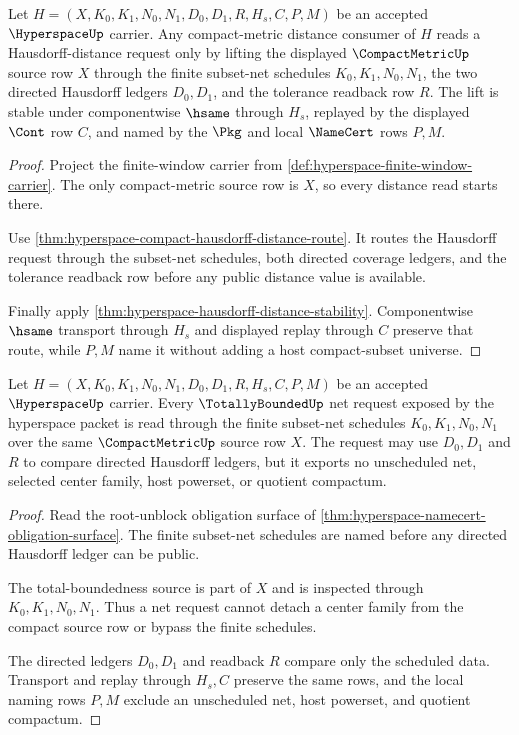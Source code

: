 \begin{theorem}
\label{thm:hyperspace-compactmetric-distance-lift}
Let $H=(X,K_0,K_1,N_0,N_1,D_0,D_1,R,H_s,C,P,M)$ be an accepted $\HyperspaceUp$ carrier. Any compact-metric distance consumer of $H$ reads a Hausdorff-distance request only by lifting the displayed $\CompactMetricUp$ source row $X$ through the finite subset-net schedules $K_0,K_1,N_0,N_1$, the two directed Hausdorff ledgers $D_0,D_1$, and the tolerance readback row $R$. The lift is stable under componentwise $\hsame$ through $H_s$, replayed by the displayed $\Cont$ row $C$, and named by the $\Pkg$ and local $\NameCert$ rows $P,M$.
\end{theorem}
\begin{proof}
Project the finite-window carrier from \autoref{def:hyperspace-finite-window-carrier}. The only compact-metric source row is $X$, so every distance read starts there.

Use \autoref{thm:hyperspace-compact-hausdorff-distance-route}. It routes the Hausdorff request through the subset-net schedules, both directed coverage ledgers, and the tolerance readback row before any public distance value is available.

Finally apply \autoref{thm:hyperspace-hausdorff-distance-stability}. Componentwise $\hsame$ transport through $H_s$ and displayed replay through $C$ preserve that route, while $P,M$ name it without adding a host compact-subset universe.
\end{proof}

\begin{theorem}
\label{thm:hyperspace-totallybounded-net-lift}
Let $H=(X,K_0,K_1,N_0,N_1,D_0,D_1,R,H_s,C,P,M)$ be an accepted $\HyperspaceUp$ carrier. Every $\TotallyBoundedUp$ net request exposed by the hyperspace packet is read through the finite subset-net schedules $K_0,K_1,N_0,N_1$ over the same $\CompactMetricUp$ source row $X$. The request may use $D_0,D_1$ and $R$ to compare directed Hausdorff ledgers, but it exports no unscheduled net, selected center family, host powerset, or quotient compactum.
\end{theorem}
\begin{proof}
Read the root-unblock obligation surface of \autoref{thm:hyperspace-namecert-obligation-surface}. The finite subset-net schedules are named before any directed Hausdorff ledger can be public.

The total-boundedness source is part of $X$ and is inspected through $K_0,K_1,N_0,N_1$. Thus a net request cannot detach a center family from the compact source row or bypass the finite schedules.

The directed ledgers $D_0,D_1$ and readback $R$ compare only the scheduled data. Transport and replay through $H_s,C$ preserve the same rows, and the local naming rows $P,M$ exclude an unscheduled net, host powerset, and quotient compactum.
\end{proof}

